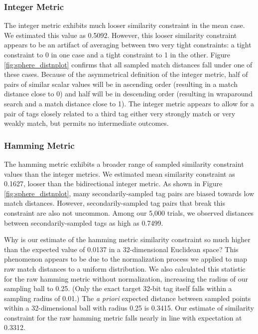 \subsubsection{Integer Metric}

The integer metric exhibits much looser similarity constraint in the mean case.
We estimated this value as 0.5092.
However, this looser similarity constraint appears to be an artifact of averaging between two very tight constraints: a tight constraint to 0 in one case and a tight constraint to 1 in the other.
Figure \ref{fig:sphere_distnplot} confirms that all sampled match distances fall under one of these cases.
Because of the asymmetrical definition of the integer metric, half of pairs of similar scalar values will be in ascending order (resulting in a match distance close to 0) and half will be in descending order (resulting in wraparound search and a match distance close to 1).
The integer metric appears to allow for a pair of tags closely related to a third tag either very strongly match or very weakly match, but permits no intermediate outcomes.

\subsubsection{Hamming Metric}

The hamming metric exhibits a broader range of sampled similarity constraint values than the integer metrics.
We estimated mean similarity constraint as 0.1627, looser than the bidirectional integer metric.
As shown in Figure \ref{fig:sphere_distnplot}, many secondarily-sampled tag pairs are biased towards low match distances.
However, secondarily-sampled tag pairs that break this constraint are also not uncommon.
Among our 5,000 trials, we observed distances between secondarily-sampled tags as high as 0.7499.

Why is our estimate of the hamming metric similarity constraint so much higher than the expected value of 0.0137 in a 32-dimensional Euclidean space?
This phenomenon appears to be due to the normalization process we applied to map raw match distances to a uniform distribution.
We also calculated this statistic for the raw hamming metric without normalization, increasing the radius of our sampling ball to 0.25.
(Only the exact target 32-bit tag itself falls within a sampling radius of 0.01.)
The \textit{a priori} expected distance between sampled points within a 32-dimensional ball with radius 0.25 is 0.3415.
Our estimate of similarity constraint for the raw hamming metric falls nearly in line with expectation at 0.3312.

